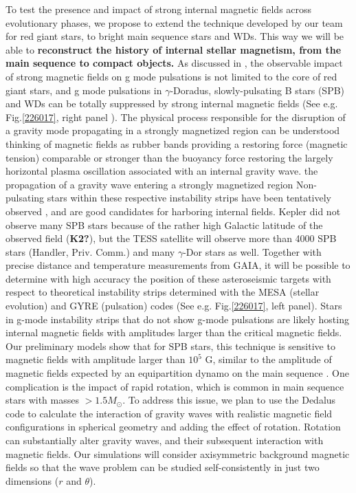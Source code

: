 To test the presence and impact of strong internal magnetic fields across evolutionary phases,
we propose to extend the technique developed by our team for red giant stars, to bright main sequence stars and WDs. This way we will be able to \textbf{reconstruct the history of internal stellar magnetism, from the main sequence to compact objects.} As discussed in \citet{Cantiello_2016}, the observable impact of strong magnetic fields on g mode pulsations is not limited to the core of red giant stars, and
 g mode pulsations in $\gamma$-Doradus, slowly-pulsating B stars (SPB) and WDs can be totally suppressed by strong internal magnetic fields (See e.g. Fig.\ref{226017}, right panel ). The physical process responsible for the disruption of a gravity mode propagating in a strongly magnetized region  can be understood thinking of magnetic fields as rubber bands providing a restoring force (magnetic tension) comparable or stronger than the buoyancy force restoring the largely horizontal plasma oscillation associated with an internal gravity wave.  the propagation of a gravity wave entering a strongly magnetized region 
Non-pulsating stars within these respective instability strips have been tentatively observed \citep{Balona_2011}, and are good candidates for harboring internal fields.
Kepler did not observe many SPB stars because of the rather high Galactic latitude of the observed field (\textbf{K2?}), but the TESS satellite will observe more than 4000 SPB stars (Handler, Priv. Comm.) and many $\gamma$-Dor stars as well. Together with precise distance and temperature measurements from GAIA, it will be possible to determine with high accuracy the position of these asteroseismic targets with respect to
theoretical instability strips determined with the MESA (stellar evolution) and GYRE (pulsation) codes (See e.g. Fig.\ref{226017}, left panel).
Stars in g-mode instability strips that do not show g-mode pulsations are likely hosting internal magnetic fields with amplitudes larger than the critical
magnetic fields. Our preliminary models show that for SPB stars, this technique is sensitive to magnetic fields with amplitude larger than $10^5$ G,
similar to the amplitude of magnetic fields expected by an equipartition dynamo on the main sequence \citep[See e.g.][]{Featherstone_2009,Augustson_2016}.
One complication is the impact of rapid rotation, which is common in main sequence stars with masses $> 1.5M_\odot$. To address this issue,
we plan to use the Dedalus code to calculate the interaction of gravity waves with realistic magnetic field configurations in spherical geometry \citep[e.g.][]{Braithwaite_2006} 
and adding the effect of rotation. Rotation can substantially alter gravity waves, and their subsequent interaction with magnetic fields. Our simulations will consider axisymmetric background magnetic fields so that the wave problem can be studied self-consistently in just two dimensions ($r$ and $\theta$). 